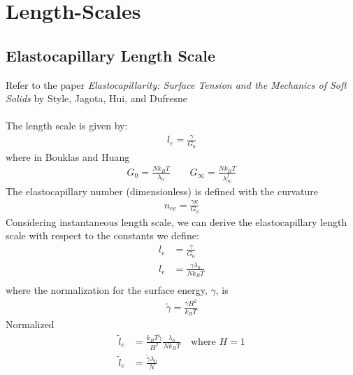 \documentclass[12pt,3p]{article}
\numberwithin{equation}{section}
\begin{document}
\section{Length-Scales}

\subsection{Elastocapillary Length Scale}
Refer to the paper \textit{Elastocapillarity: Surface Tension and the Mechanics of Soft Solids} by Style, Jagota, Hui, and Dufresne \\ \\
The length scale is given by:
\begin{align}\label{elastocapLengthScale}
l_e = \frac{\gamma}{G_0} 
\end{align}
where in Bouklas and Huang 
\begin{align*}
G_0 = \frac{N k_B T}{\lambda_0} \quad \quad G_\infty = \frac{N k_B T}{\lambda_{\infty}^f}
\end{align*}
The elastocapillary number (dimensionless) is defined with the curvature
\begin{align}
n_{ec} = \frac{\gamma \kappa}{G_0}
\end{align}
Considering instantaneous length scale, we can derive the elastocapillary length scale with respect to the constants we define:
\begin{align*}
l_e &= \frac{\gamma}{G_0} \\
l_e &= \frac{\gamma \lambda_0}{N k_B T} \\
\end{align*}
where the normalization for the surface energy, $\gamma$, is 
\begin{align*}
\tilde{\gamma} = \frac{\gamma H^2}{k_B T}
\end{align*}
Normalized 
\begin{align*}
\tilde{l}_e &= \frac{k_B T \tilde{\gamma}}{H^2} \frac{\lambda_0}{N k_B T} \quad \text{where } H = 1 \\
\tilde{l}_e &= \frac{\tilde{\gamma} \lambda_0}{N}
\end{align*}
\end{document}
